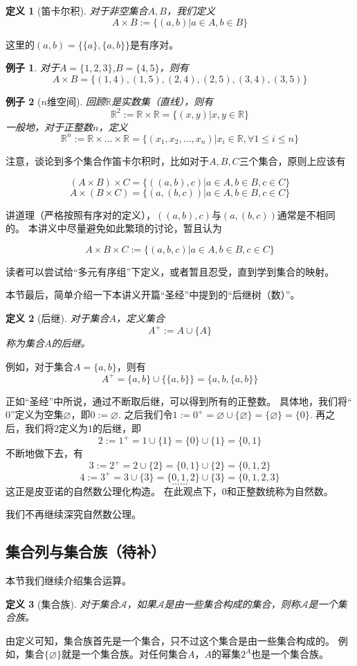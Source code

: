 \documentclass[a4paper, 11pt]{article} %
\newcommand*{\vs}{\vspace{5pt}}
\newtheorem{definition}{定义}[subsection]
\newtheorem{example}{例子}[subsection]
\begin{document}
\begin{definition}[笛卡尔积]
对于非空集合$A,B$，我们定义
$$A\times B:=\{(a,b)|a\in A, b\in B\}$$
\end{definition}
这里的$(a,b)=\{\{a\},\{a,b\}\}$是有序对。

\begin{example}对于$A=\{1,2,3\}$,$B=\{4,5\}$，则有
$$A\times B=\{(1,4),(1,5),(2,4),(2,5),(3,4),(3,5)\}$$
\end{example}

\begin{example}[$n$维空间]
回顾$\mathbb{R}$是实数集（直线），则有
$$\mathbb{R}^2:=\mathbb{R}\times\mathbb{R}
=\{(x,y)|x,y\in\mathbb{R}\}$$
一般地，对于正整数$n$，定义
$$\mathbb{R}^n:=\mathbb{R}\times...\times\mathbb{R}
=\{(x_1,x_2,...,x_n)|x_i\in\mathbb{R},\forall 1\leq i\leq n\}$$
\end{example}
注意，谈论到多个集合作笛卡尔积时，比如对于$A,B,C$三个集合，原则上应该有

$$(A\times B)\times C=\{((a,b),c)|a\in A,b\in B, c\in C\}$$
$$A\times (B\times C)=\{(a,(b,c))|a\in A,b\in B, c\in C\}$$

讲道理（严格按照有序对的定义），$((a,b),c)$与$(a,(b,c))$通常是不相同的。
本讲义中尽量避免如此繁琐的讨论，暂且认为

$$A\times B\times C:=\{(a,b,c)|a\in A,b\in B, c\in C\}$$

读者可以尝试给“多元有序组”下定义，或者暂且忍受，直到学到集合的映射。\vs

本节最后，简单介绍一下本讲义开篇“圣经”中提到的“后继树（数）”。
\begin{definition}[后继]
对于集合$A$，定义集合
$$A^+:=A\cup\{A\}$$
称为集合$A$的后继。
\end{definition}

例如，对于集合$A=\{a,b\}$，则有
$$A^+=\{a,b\}\cup\{\{a,b\}\}=\{a,b,\{a,b\}\}$$

正如“圣经”中所说，通过不断取后继，可以得到所有的正整数。
具体地，我们将“$0$”定义为空集$\varnothing$，即$0:=\varnothing$.
之后我们令$1:=0^+=\varnothing\cup\{\varnothing\}=\{\varnothing\}=\{0\}$.
再之后，我们将$2$定义为$1$的后继，即
$$2:=1^+=1\cup\{1\}=\{0\}\cup\{1\}=\{0,1\}$$
不断地做下去，有
$$3:=2^+=2\cup\{2\}=\{0,1\}\cup\{2\}=\{0,1,2\}$$
$$4:=3^+=3\cup\{3\}=\{0,1,2\}\cup\{3\}=\{0,1,2,3\}$$
$$......$$
这正是皮亚诺的自然数公理化构造。
在此观点下，0和正整数统称为自然数。

我们不再继续深究自然数公理。

\subsection{集合列与集合族（待补）}
本节我们继续介绍集合运算。
\begin{definition}[集合族]
对于集合$\mathcal{A}$，如果$\mathcal{A}$是由一些集合构成的集合，则称$\mathcal{A}$是一个集合族。
\end{definition}
由定义可知，集合族首先是一个集合，只不过这个集合是由一些集合构成的。
例如，集合$\{\varnothing\}$就是一个集合族。对任何集合$A$，$A$的幂集$2^A$也是一个集合族。
\end{document}
